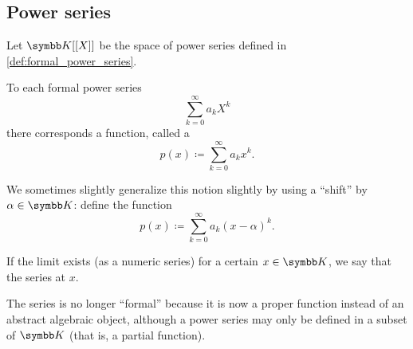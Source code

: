 \subsection{Power series}\label{subsec:power_series}

\begin{definition}\label{def:convergent_power_series}
  Let \( \K[[X]] \) be the space of power series defined in \cref{def:formal_power_series}.

  To each formal power series
  \begin{equation*}
    \sum_{k=0}^\infty a_k X^k
  \end{equation*}
  there corresponds a function, called a 
  \begin{equation}\label{def:convergent_power_series/series}
    p(x) \coloneqq \sum_{k=0}^\infty a_k x^k.
  \end{equation}

  We sometimes slightly generalize this notion slightly by using a \enquote{shift} by \( \alpha \in \K \): define the function
  \begin{equation}\label{def:convergent_power_series/shifted_series}
    p(x) \coloneqq \sum_{k=0}^\infty a_k (x - \alpha)^k.
  \end{equation}

  If the limit exists (as a numeric series) for a certain \( x \in \K \), we say that the series  at \( x \).

  The series is no longer \enquote{formal} because it is now a proper function instead of an abstract algebraic object, although a power series may only be defined in a subset of \( \K \) (that is, a partial function).
\end{definition}


